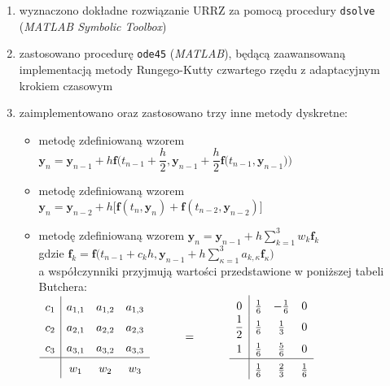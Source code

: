 \documentclass[a4paper, 12pt, twoside, openany]{article}
\begin{document}
    \begin{enumerate}
        \item wyznaczono dokładne rozwiązanie URRZ za pomocą procedury \texttt{dsolve} (\textit{MATLAB Symbolic Toolbox})
        \item zastosowano procedurę \texttt{ode45} (\textit{MATLAB}), będącą zaawansowaną implementacją metody Rungego-Kutty czwartego rzędu z adaptacyjnym krokiem czasowym
        \item zaimplementowano oraz zastosowano trzy inne metody dyskretne:
        \begin{itemize}[label=\scriptsize$\bullet$]
            \item metodę zdefiniowaną wzorem
            $\mathbf{y}_n = \mathbf{y}_{n-1} + h\mathbf{f}\bigg(t_{n-1} + \dfrac{h}{2},\mathbf{y}_{n-1} + \dfrac{h}{2}\mathbf{f}\big(t_{n-1},\mathbf{y}_{n-1}\big)\bigg)$
            \item metodę zdefiniowaną wzorem
            $ \mathbf{y}_n = \mathbf{y}_{n-2} + h\Big[\mathbf{f}\left(t_{n},\mathbf{y}_{n}\right) + \mathbf{f}\left(t_{n-2},\mathbf{y}_{n-2}\right)\Big]$
            \item metodę zdefiniowaną wzorem
            $\mathbf{y}_n = \mathbf{y}_{n-1} + h\sum\limits_{k=1}^{3}w_k\mathbf{f}_k$
            \\gdzie
            $\mathbf{f}_k = \mathbf{f}\bigg(t_{n-1}+c_kh,\mathbf{y}_{n-1} + h\sum\limits_{\kappa=1}^{3}a_{k,\kappa}\mathbf{f}_\kappa\bigg)$
            \\[0.5em] a współczynniki przyjmują wartości przedstawione w poniższej tabeli Butchera: \\[0.5em]
            $\arraycolsep=5pt\def\arraystretch{1.5}
            \begin{array}{c|ccc}
                c_1 & a_{1,1} & a_{1,2} & a_{1,3} \\
                c_2 & a_{2,1} & a_{2,2} & a_{2,3} \\
                c_3 & a_{3,1} & a_{3,2} & a_{3,3} \\
                \hline
                    & w_1 & w_2 & w_3
            \end{array}
            \hspace{1cm} = \hspace{1cm}
            \begin{array}{c|ccc}
                0            & \frac{1}{6} & -\frac{1}{6} & 0 \\
                \dfrac{1}{2} & \frac{1}{6} & \frac{1}{3} & 0 \\
                1            & \frac{1}{6} & \frac{5}{6} & 0 \\
                \hline
                & \frac{1}{6} & \frac{2}{3} & \frac{1}{6}
            \end{array} $
        \end{itemize}
    \end{enumerate}
\end{document}
